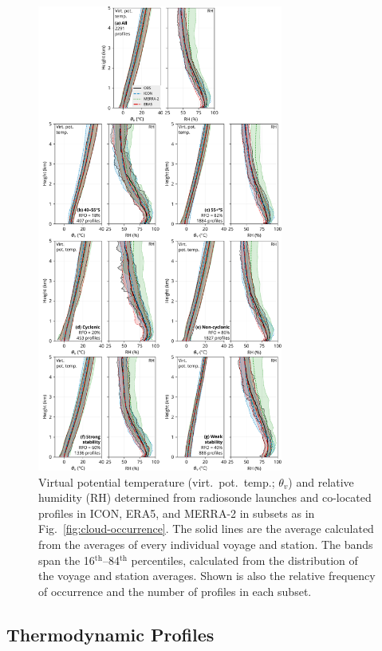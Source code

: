 \documentclass[draft]{agujournal2019}
\begin{document}
\begin{figure}[p!]
\centering
\includegraphics[width=0.72\textwidth]{img/theta_hur.pdf}
\caption{
Virtual potential temperature (virt.\ pot.\ temp.; $\theta_v$) and relative humidity (RH) determined from radiosonde launches and co-located profiles in ICON, ERA5, and MERRA-2 in subsets as in Fig.~\ref{fig:cloud-occurrence}. The solid lines are the average calculated from the averages of every individual voyage and station. The bands span the 16$^\mathrm{th}$--84$^\mathrm{th}$ percentiles, calculated from the distribution of the voyage and station averages. Shown is also the relative frequency of occurrence and the number of profiles in each subset.
}
\label{fig:potential-temperature}
\end{figure}

\subsection{Thermodynamic Profiles}
\end{document}
